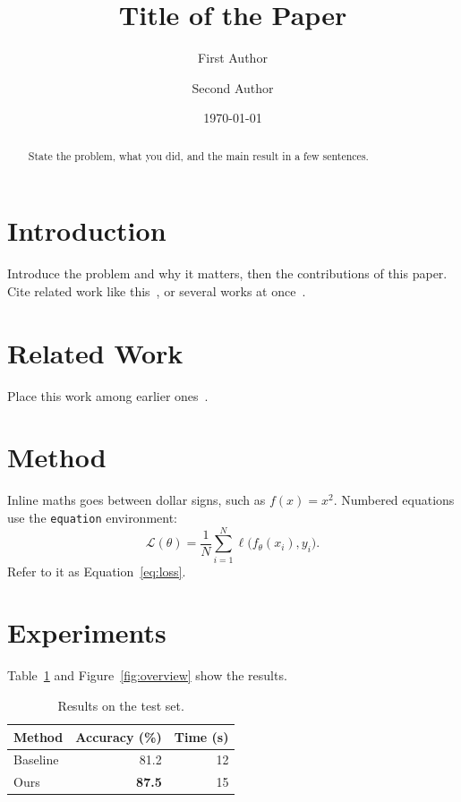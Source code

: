 \documentclass[reprint,amsmath,amssymb,aps,prl]{revtex4-2}
\begin{document}
\title{Title of the Paper}

\author{First Author}
\author{Second Author}

\date{\today}

\begin{abstract}
State the problem, what you did, and the main result in a few sentences.
\end{abstract}

\maketitle

\section{Introduction}
\label{sec:intro}
Introduce the problem and why it matters, then the contributions of this
paper. Cite related work like this~\cite{he2016deep}, or several works at
once~\cite{vaswani2017attention,he2016deep}.

\section{Related Work}
Place this work among earlier ones~\cite{knuth1984,lamport1994}.

\section{Method}
\label{sec:method}
Inline maths goes between dollar signs, such as $f(x) = x^2$. Numbered
equations use the \texttt{equation} environment:
\begin{equation}
  \label{eq:loss}
  \mathcal{L}(\theta) = \frac{1}{N} \sum_{i=1}^{N} \ell\bigl(f_\theta(x_i), y_i\bigr).
\end{equation}
Refer to it as Equation~\eqref{eq:loss}.

\section{Experiments}
\label{sec:experiments}
Table~\ref{tab:results} and Figure~\ref{fig:overview} show the results.

\begin{table}[htbp]
  \centering
  \caption{Results on the test set.}
  \label{tab:results}
  \begin{tabular}{lrr}
    \toprule
    Method & Accuracy (\%) & Time (s) \\
    \midrule
    Baseline & 81.2 & 12 \\
    Ours     & \textbf{87.5} & 15 \\
    \bottomrule
  \end{tabular}
\end{table}
\end{document}
